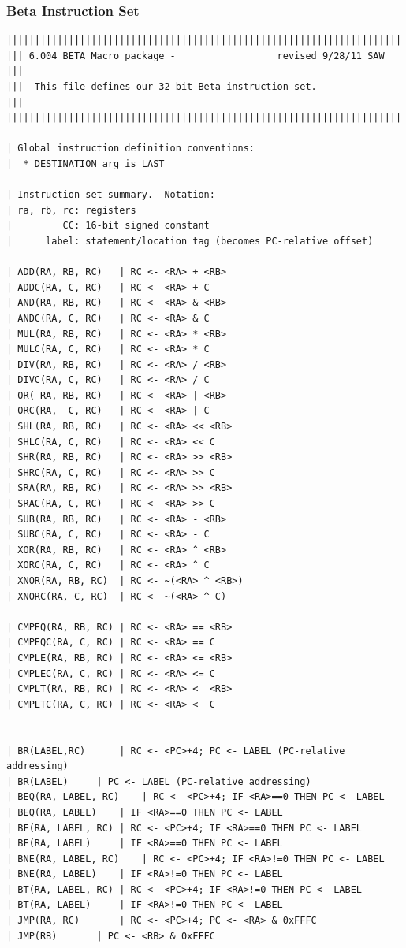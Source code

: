 \documentclass{article}
\begin{document}
\subsubsection{Beta Instruction Set}
\begin{lstlisting}
||||||||||||||||||||||||||||||||||||||||||||||||||||||||||||||||||||||||
||| 6.004 BETA Macro package -                  revised 9/28/11 SAW  |||
|||  This file defines our 32-bit Beta instruction set.              |||
||||||||||||||||||||||||||||||||||||||||||||||||||||||||||||||||||||||||

| Global instruction definition conventions:
|  * DESTINATION arg is LAST

| Instruction set summary.  Notation:
| ra, rb, rc: registers
|         CC: 16-bit signed constant
|      label: statement/location tag (becomes PC-relative offset)

| ADD(RA, RB, RC)	| RC <- <RA> + <RB>
| ADDC(RA, C, RC)	| RC <- <RA> + C
| AND(RA, RB, RC)	| RC <- <RA> & <RB>
| ANDC(RA, C, RC)	| RC <- <RA> & C
| MUL(RA, RB, RC)	| RC <- <RA> * <RB>
| MULC(RA, C, RC)	| RC <- <RA> * C
| DIV(RA, RB, RC)	| RC <- <RA> / <RB>
| DIVC(RA, C, RC)	| RC <- <RA> / C
| OR( RA, RB, RC)	| RC <- <RA> | <RB>
| ORC(RA,  C, RC)	| RC <- <RA> | C
| SHL(RA, RB, RC)	| RC <- <RA> << <RB>
| SHLC(RA, C, RC)	| RC <- <RA> << C
| SHR(RA, RB, RC)	| RC <- <RA> >> <RB>
| SHRC(RA, C, RC)	| RC <- <RA> >> C
| SRA(RA, RB, RC)	| RC <- <RA> >> <RB>
| SRAC(RA, C, RC)	| RC <- <RA> >> C
| SUB(RA, RB, RC)	| RC <- <RA> - <RB>
| SUBC(RA, C, RC)	| RC <- <RA> - C
| XOR(RA, RB, RC)	| RC <- <RA> ^ <RB>
| XORC(RA, C, RC)	| RC <- <RA> ^ C
| XNOR(RA, RB, RC)	| RC <- ~(<RA> ^ <RB>)
| XNORC(RA, C, RC)	| RC <- ~(<RA> ^ C)

| CMPEQ(RA, RB, RC)	| RC <- <RA> == <RB>
| CMPEQC(RA, C, RC)	| RC <- <RA> == C
| CMPLE(RA, RB, RC)	| RC <- <RA> <= <RB>
| CMPLEC(RA, C, RC)	| RC <- <RA> <= C
| CMPLT(RA, RB, RC)	| RC <- <RA> <  <RB>
| CMPLTC(RA, C, RC)	| RC <- <RA> <  C


| BR(LABEL,RC)		| RC <- <PC>+4; PC <- LABEL (PC-relative addressing)
| BR(LABEL)		| PC <- LABEL (PC-relative addressing)
| BEQ(RA, LABEL, RC)	| RC <- <PC>+4; IF <RA>==0 THEN PC <- LABEL
| BEQ(RA, LABEL)	| IF <RA>==0 THEN PC <- LABEL
| BF(RA, LABEL, RC)	| RC <- <PC>+4; IF <RA>==0 THEN PC <- LABEL
| BF(RA, LABEL)		| IF <RA>==0 THEN PC <- LABEL
| BNE(RA, LABEL, RC)	| RC <- <PC>+4; IF <RA>!=0 THEN PC <- LABEL
| BNE(RA, LABEL)	| IF <RA>!=0 THEN PC <- LABEL
| BT(RA, LABEL, RC)	| RC <- <PC>+4; IF <RA>!=0 THEN PC <- LABEL
| BT(RA, LABEL)		| IF <RA>!=0 THEN PC <- LABEL
| JMP(RA, RC)		| RC <- <PC>+4; PC <- <RA> & 0xFFFC
| JMP(RB)		| PC <- <RB> & 0xFFFC


\end{lstlisting}
\end{document}
